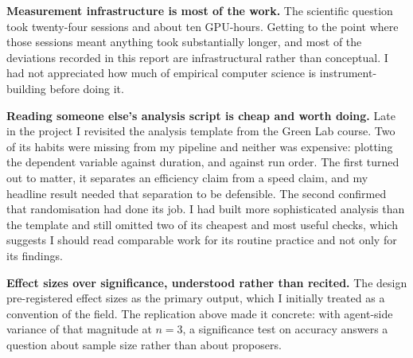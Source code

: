 \textbf{Measurement infrastructure is most of the work.} The scientific question
took twenty-four sessions and about ten GPU-hours. Getting to the point where
those sessions meant anything took substantially longer, and most of the
deviations recorded in this report are infrastructural rather than conceptual. I
had not appreciated how much of empirical computer science is instrument-building
before doing it.

\textbf{Reading someone else's analysis script is cheap and worth doing.} Late in
the project I revisited the analysis template from the Green Lab course. Two of
its habits were missing from my pipeline and neither was expensive: plotting the
dependent variable against duration, and against run order. The first turned out
to matter, it separates an efficiency claim from a speed claim, and my
headline result needed that separation to be defensible. The second confirmed
that randomisation had done its job. I had built more sophisticated analysis than
the template and still omitted two of its cheapest and most useful checks, which
suggests I should read comparable work for its routine practice and not only for
its findings.

\textbf{Effect sizes over significance, understood rather than recited.} The
design pre-registered effect sizes as the primary output, which I initially
treated as a convention of the field. The replication above made it concrete:
with agent-side variance of that magnitude at $n=3$, a significance test on
accuracy answers a question about sample size rather than about proposers.
